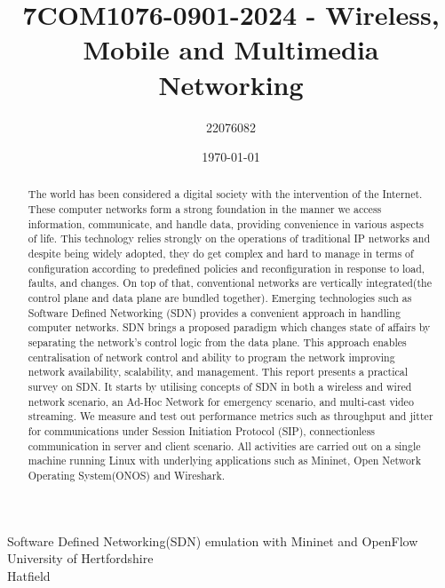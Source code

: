 \documentclass{article}
\title{7COM1076-0901-2024 - Wireless, Mobile and Multimedia Networking}
\author{22076082}
\date{\today}
\begin{document}
\maketitle
\vspace{70pt}
\begin{center}
	\huge{Software Defined Networking(SDN) emulation with Mininet and OpenFlow} \\ [100pt]
	\vspace{70pt}
	\large{University of Hertfordshire} \\
	\large{Hatfield}
\end{center}

\newpage
\tableofcontents
\newpage
\listoftables
\listoffigures

\newpage
\begin{abstract}
The world has been considered a digital society with the intervention of the Internet. These computer networks form a strong foundation in the manner we access information, communicate, and handle data, providing convenience in various aspects of life. This technology relies strongly on the operations of traditional IP networks and despite being widely adopted, they do get complex and hard to manage in terms of configuration according to predefined policies and reconfiguration in response to load, faults, and changes. On top of that, conventional networks are vertically integrated(the control plane and data plane are bundled together). Emerging technologies such as Software Defined Networking (SDN) provides a convenient approach in handling computer networks. SDN brings a proposed paradigm which changes state of affairs by separating the network's control logic from the data plane. This approach enables centralisation of network control and ability to program the network improving network availability, scalability, and management. This report presents a practical survey on SDN. It starts by utilising concepts of SDN in both a wireless and wired network scenario, an Ad-Hoc Network for emergency scenario, and multi-cast video streaming. We measure and test out performance metrics such as throughput and jitter for communications under Session Initiation Protocol (SIP), connectionless communication in server and client scenario. All activities are carried out on a single machine running Linux with underlying applications such as Mininet, Open Network Operating System(ONOS) and Wireshark.
\end{abstract}

\newpage
\end{document}
